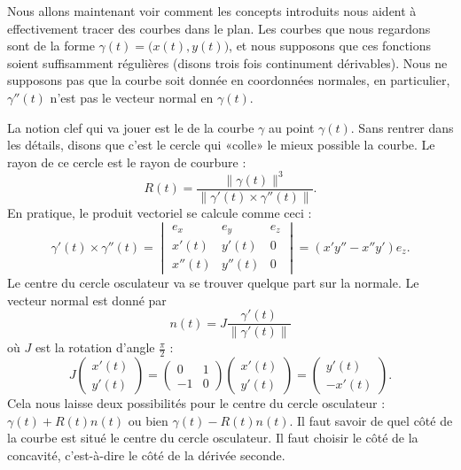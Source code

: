 Nous allons maintenant voir comment les concepts introduits nous aident à effectivement tracer des courbes dans le plan. Les courbes que nous regardons sont de la forme \( \gamma(t)=\big( x(t),y(t) \big)\), et nous supposons que ces fonctions soient suffisamment régulières (disons trois fois continument dérivables). Nous ne supposons pas que la courbe soit donnée en coordonnées normales, en particulier, \( \gamma''(t)\) n'est pas le vecteur normal en \( \gamma(t)\).

La notion clef qui va jouer est le  de la courbe \( \gamma\) au point \( \gamma(t)\). Sans rentrer dans les détails, disons que c'est le cercle qui «colle» le mieux possible la courbe. Le rayon de ce cercle est le rayon de courbure :
\begin{equation}
	R(t)=\frac{ \| \gamma(t) \|^3 }{ \| \gamma'(t)\times\gamma''(t) \| }.
\end{equation}
En pratique, le produit vectoriel se calcule comme ceci :
\begin{equation}
	\gamma'(t)\times\gamma''(t)=\begin{vmatrix}
		e_x    & e_y    & e_z \\
		x'(t)  & y'(t)  & 0   \\
		x''(t) & y''(t) & 0
	\end{vmatrix}=(x'y''-x''y')e_z.
\end{equation}
Le centre du cercle osculateur va se trouver quelque part sur la normale. Le vecteur normal est donné par
\begin{equation}
	n(t)=J\frac{\gamma'(t) }{ \| \gamma'(t) \| }
\end{equation}
où \( J\) est la rotation d'angle \( \frac{ \pi }{2}\) :
\begin{equation}
	J\begin{pmatrix}
		x'(t) \\
		y'(t)
	\end{pmatrix}=
	\begin{pmatrix}
		0  & 1 \\
		-1 & 0
	\end{pmatrix}\begin{pmatrix}
		x'(t) \\
		y'(t)
	\end{pmatrix}=\begin{pmatrix}
		y'(t) \\
		-x'(t)
	\end{pmatrix}.
\end{equation}
Cela nous laisse deux possibilités pour le centre du cercle osculateur : \( \gamma(t)+R(t)n(t)\) ou bien \( \gamma(t)-R(t)n(t)\). Il faut savoir de quel côté de la courbe est situé le centre du cercle osculateur. Il faut choisir le côté de la concavité, c'est-à-dire le côté de la dérivée seconde.

